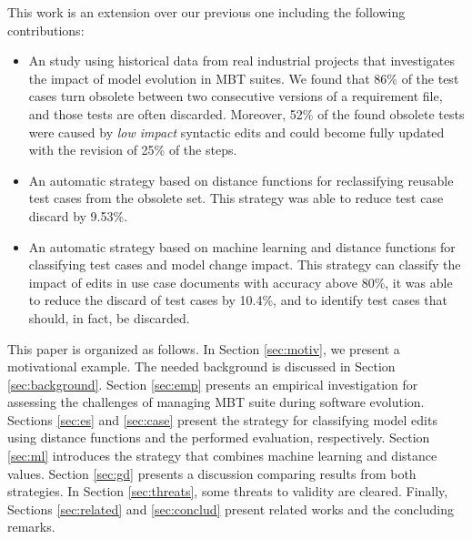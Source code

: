 This work is an extension over our previous one \citep{diniz2019reducing} including the following contributions:
\begin{itemize}
\item An study using historical data from real industrial projects that investigates the impact of model evolution in MBT suites. We found that 86\% of the test cases turn obsolete between two consecutive versions of a requirement file, and those tests are often discarded. Moreover, 52\% of the found obsolete tests
were caused by \textit{low impact} syntactic edits and could become fully updated with the revision of 25\% of the steps.
\item An automatic strategy based on distance functions for reclassifying reusable test cases from the obsolete set. 
This strategy was able to reduce test case discard by  9.53\%.
\item An automatic strategy based on machine learning and distance functions %
for classifying test cases and model change impact. This strategy can classify the impact of edits in use case documents with accuracy above 80\%, it was able to reduce the discard of test cases by 10.4\%, and to identify test cases that should, in fact, be discarded.
\end{itemize}



This paper is organized as follows. In Section \ref{sec:motiv}, we present a motivational example. The needed background is discussed in Section \ref{sec:background}. Section \ref{sec:emp} presents an empirical investigation for assessing the challenges of managing MBT suite during software evolution. Sections \ref{sec:es} and \ref{sec:case} present the strategy for classifying model edits using distance functions and the performed evaluation, respectively. Section \ref{sec:ml} introduces the strategy that combines machine learning and distance values. Section \ref{sec:gd} presents a discussion comparing results from both strategies. In Section \ref{sec:threats}, some threats to validity are cleared. Finally, Sections \ref{sec:related} and \ref{sec:conclud} present related works and the concluding remarks.